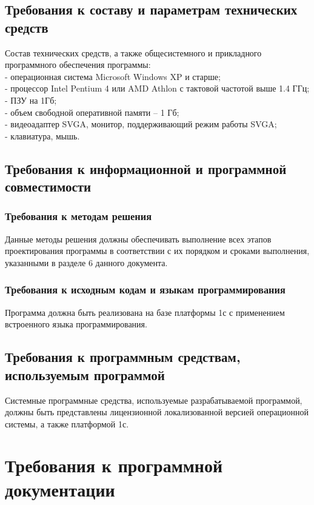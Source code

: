 \documentclass{article}
\begin{document}
    \subsection{Требования к составу и параметрам технических средств}
    Состав технических средств, а также общесистемного и прикладного программного обеспечения программы:\\
    - операционная система Microsoft Windows XP и старше;\\
    - процессор Intel Pentium 4 или AMD Athlon с тактовой частотой выше 1.4 ГГц;\\
    - ПЗУ на 1Гб;\\
    - объем свободной оперативной памяти – 1 Гб;\\
    - видеоадаптер SVGA, монитор, поддерживающий режим работы SVGA; \\
    - клавиатура, мышь.

    \subsection{Требования к информационной и программной совместимости}
        \subsubsection{Требования к методам решения}
        
        Данные методы решения должны обеспечивать выполнение всех этапов проектирования программы в соответствии с их порядком и сроками выполнения, указанными в разделе 6 данного документа.
        \subsubsection{Требования к исходным кодам и языкам программирования}
        Программа должна быть реализована на базе платформы 1с с применением встроенного языка программирования.
        
    \subsection{Требования к программным средствам, используемым программой}
    Системные программные средства, используемые разрабатываемой программой, должны быть представлены лицензионной локализованной версией операционной системы, а также платформой 1с.
    
\section{Требования к программной документации}
\end{document}
